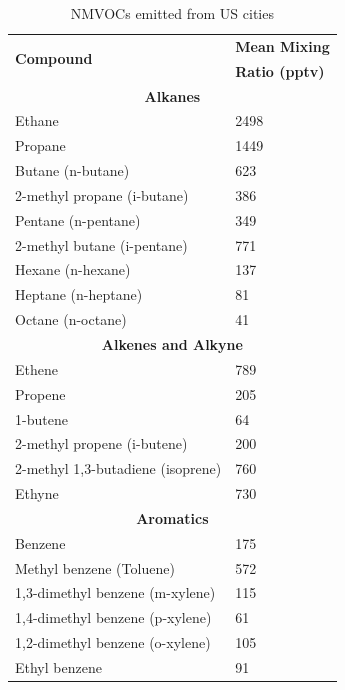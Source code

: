 \begin{table}[!ht]  
    \begin{center}
        \begin{tabular}{ll}
            \hline \hline
            \multirow{2}{*}{\textbf{Compound}} & \textbf{Mean Mixing} \\ & \textbf{Ratio (pptv)} \\
            \hline \hline \multicolumn{2}{c}{\textbf{Alkanes}}  \\ \hline
            Ethane & 2498 \\
            Propane  & 1449 \\
            Butane (n-butane) & 623 \\
            2-methyl propane (i-butane) & 386 \\
			Pentane (n-pentane) & 349 \\
            2-methyl butane (i-pentane) &771 \\
		    Hexane (n-hexane) & 137 \\
            Heptane (n-heptane) & 81 \\
            Octane (n-octane) & 41 \\ \hline \multicolumn{2}{c}{\textbf{Alkenes and Alkyne}} \\ \hline
            Ethene &789 \\
			Propene & 205 \\
            1-butene & 64 \\
            2-methyl propene (i-butene) & 200 \\
            2-methyl 1,3-butadiene (isoprene) & 760 \\
            Ethyne & 730 \\ \hline \multicolumn{2}{c}{\textbf{Aromatics}} \\ \hline 
			Benzene & 175 \\
            Methyl benzene (Toluene) & 572 \\
            1,3-dimethyl benzene (m-xylene) & 115 \\
            1,4-dimethyl benzene (p-xylene) & 61 \\
            1,2-dimethyl benzene (o-xylene) & 105 \\
			Ethyl benzene & 91 \\ \hline \hline
        \end{tabular}
    \end{center}
    \caption{NMVOCs emitted from US cities \citep{Baker:2008}} 
    \label{t:VOClist}
\end{table}

